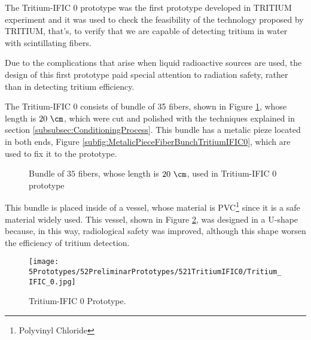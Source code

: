 The Tritium-IFIC 0 prototype was the first prototype developed in TRITIUM experiment and it was used to check the feasibility of the technology proposed by TRITIUM, that's, to verify that we are capable of detecting tritium in water with scintillating fibers.

Due to the complications that arise when liquid radioactive sources are used, the design of this first prototype paid special attention to radiation safety, rather than in detecting tritium efficiency.

The Tritium-IFIC 0 consists of bundle of 35 fibers, shown in Figure \ref{fig:FiberBundleOfTritiumIFIC0}, whose length is $20~\cm$, which were cut and polished with the techniques explained in section \ref{subsubsec:ConditioningProcess}. This bundle has a metalic pieze located in both ends, Figure \ref{subfig:MetalicPieceFiberBunchTritiumIFIC0}, which are used to fix it to the prototype.

\begin{figure}[h]
 \centering
    \newline
 \caption{Bundle of $35$ fibers, whose length is $20~\cm$, used in Tritium-IFIC 0 prototype}
 \label{fig:FiberBundleOfTritiumIFIC0}
\end{figure}

This bundle is placed inside of a vessel, whose material is PVC\footnote{Polyvinyl Chloride}  since it is a safe material widely used. This vessel, shown in Figure \ref{fig:TritiumIFIC0}, was designed in a U-shape because, in this way, radiological safety was improved, although this shape worsen the efficiency of tritium detection.

\begin{figure}[h]
\centering
\texttt{[image: 5Prototypes/52PreliminarPrototypes/521TritiumIFIC0/Tritium\_IFIC\_0.jpg]}
\caption{Tritium-IFIC 0 Prototype.\label{fig:TritiumIFIC0}}
\end{figure}


